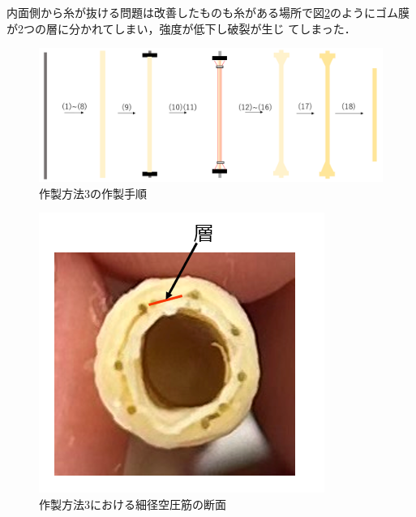 内面側から糸が抜ける問題は改善したものも糸がある場所で図\ref{fig:25}のようにゴム膜が2つの層に分かれてしまい，強度が低下し破裂が生じ
てしまった．
\begin{figure}[t]
  \centering  %
  \includegraphics[scale=0.4]{pic/2211.PNG}
  \caption{作製方法3の作製手順}
  \label{fig:24}
\end{figure}
\begin{figure}[h]
  \centering  %
  \includegraphics[scale=0.8]{pic/24.PNG}
  \caption{作製方法3における細径空圧筋の断面}
  \label{fig:25}
\end{figure}
\newpage

